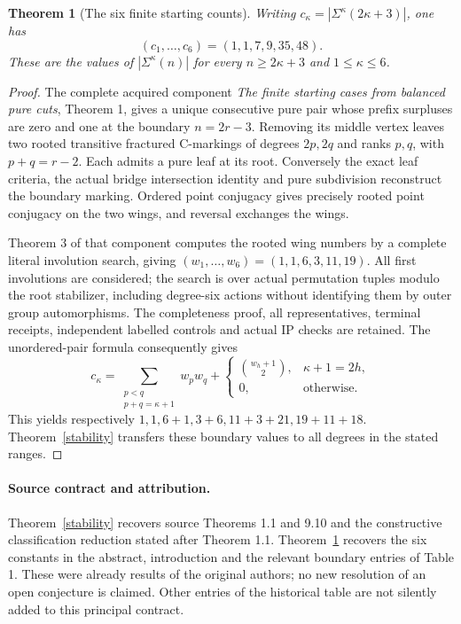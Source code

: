 \documentclass[11pt,a4paper]{article}
\newtheorem{theorem}{Theorem}\newtheorem{corollary}[theorem]{Corollary}
\begin{document}
\begin{theorem}[The six finite starting counts]\label{counts}
Writing $c_\kappa=|\Sigma^\kappa(2\kappa+3)|$, one has
\[
                         (c_1,\ldots,c_6)=(1,1,7,9,35,48).
\]
These are the values of $|\Sigma^\kappa(n)|$ for every
$n\ge2\kappa+3$ and $1\le\kappa\le6$.
\end{theorem}
\begin{proof}
The complete acquired component \emph{The finite starting cases from
balanced pure cuts}, Theorem 1, gives a unique consecutive pure pair
whose prefix surpluses are zero and one at the boundary $n=2r-3$.
Removing its middle vertex leaves two rooted transitive fractured
C-markings of degrees $2p,2q$ and ranks $p,q$, with $p+q=r-2$.
Each admits a pure leaf at its root. Conversely the exact leaf criteria,
the actual bridge intersection identity and pure subdivision reconstruct
the boundary marking. Ordered point conjugacy gives precisely rooted
point conjugacy on the two wings, and reversal exchanges the wings.

Theorem 3 of that component computes the rooted wing numbers by a
complete literal involution search, giving
$(w_1,\ldots,w_6)=(1,1,6,3,11,19)$. All first involutions are considered;
the search is over actual permutation tuples modulo the root stabilizer,
including degree-six actions without identifying them by outer group
automorphisms. The completeness proof, all representatives, terminal
receipts, independent labelled controls and actual IP checks are retained.
The unordered-pair formula consequently gives
\[
 c_\kappa=\sum_{\substack{p<q\\p+q=\kappa+1}}w_pw_q+
 \begin{cases}\binom{w_h+1}{2},&\kappa+1=2h,\\0,&\text{otherwise}.
 \end{cases}
\]
This yields respectively $1,1,6+1,3+6,11+3+21,19+11+18$.
Theorem~\ref{stability} transfers these boundary values to all degrees
in the stated ranges.
\end{proof}

\paragraph{Source contract and attribution.}
Theorem~\ref{stability} recovers source Theorems 1.1 and 9.10 and the
constructive classification reduction stated after Theorem 1.1.
Theorem~\ref{counts} recovers the six constants in the abstract,
introduction and the relevant boundary entries of Table 1. These were
already results of the original authors; no new resolution of an open
conjecture is claimed. Other entries of the historical table are not
silently added to this principal contract.
\end{document}
